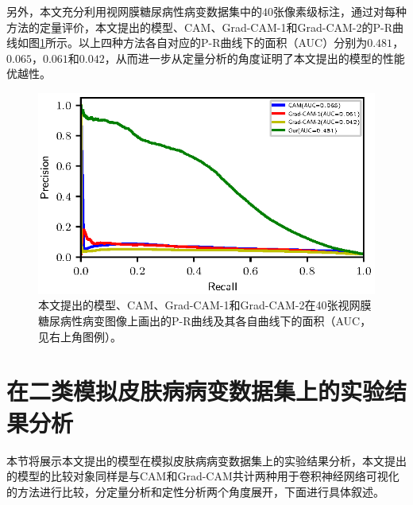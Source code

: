 另外，本文充分利用视网膜糖尿病性病变数据集中的$40$张像素级标注，通过对每种方法的定量评价，本文提出的模型、CAM、Grad-CAM-1和Grad-CAM-2的P-R曲线如图\ref{fig:retinal_image_pr_curve}所示。以上四种方法各自对应的P-R曲线下的面积（AUC）分别为$0.481$，$0.065$，$0.061$和$0.042$，从而进一步从定量分析的角度证明了本文提出的模型的性能优越性。

\begin{figure}[h]
	\centering
	\includegraphics[width=1.0\textwidth]{figure/pr_curve_retinal_image/pr_curve.eps}
	\caption{本文提出的模型、CAM、Grad-CAM-1和Grad-CAM-2在40张视网膜糖尿病性病变图像上画出的P-R曲线及其各自曲线下的面积（AUC，见右上角图例）。} 
	\label{fig:retinal_image_pr_curve}
\end{figure}

\section{在二类模拟皮肤病病变数据集上的实验结果分析}
本节将展示本文提出的模型在模拟皮肤病病变数据集上的实验结果分析，本文提出的模型的比较对象同样是与CAM和Grad-CAM共计两种用于卷积神经网络可视化的方法进行比较，分定量分析和定性分析两个角度展开，下面进行具体叙述。

